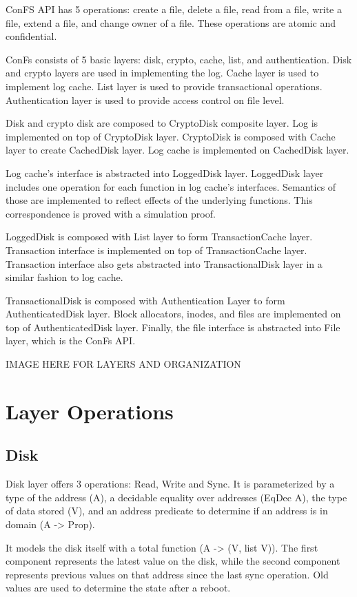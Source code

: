 


ConFS API has 5 operations: create a file, delete a file, read from a file, write a file, extend a file, and change owner of a file. These operations are atomic and confidential.

ConFs consists of 5 basic layers: disk, crypto, cache, list, and authentication. Disk and crypto layers are used in implementing the log. Cache layer is used to implement log cache. List layer is used to provide transactional operations. Authentication layer is used to provide access control on file level.

Disk and crypto disk are composed to CryptoDisk composite layer. Log is implemented on top of CryptoDisk layer. CryptoDisk is composed with Cache layer to create CachedDisk layer. Log cache is implemented on CachedDisk layer.

Log cache's interface is abstracted into LoggedDisk layer. LoggedDisk layer includes one operation for each function in log cache's interfaces. Semantics of those are implemented to reflect effects of the underlying functions. This correspondence is proved with a simulation proof.

LoggedDisk is composed with List layer to form TransactionCache layer. Transaction interface is implemented on top of TransactionCache layer. Transaction interface also gets abstracted into TransactionalDisk layer in a similar fashion to log cache.

TransactionalDisk is composed with Authentication Layer to form AuthenticatedDisk layer. Block allocators, inodes, and files are implemented on top of AuthenticatedDisk layer. Finally, the file interface is abstracted into File layer, which is the ConFs API.

{\color{red} IMAGE HERE FOR LAYERS AND ORGANIZATION}

\section{Layer Operations}
\subsection{Disk}
Disk layer offers 3 operations: Read, Write and Sync. It is parameterized by a type of the address (A), a decidable equality over addresses (EqDec A), the type of data stored (V), and an address predicate to determine if an address is in domain (A -> Prop). 

It models the disk itself with a total function (A -> (V, list V)). The first component represents the latest value on the disk, while the second component represents previous values on that address since the last sync operation. Old values are used to determine the state after a reboot.

